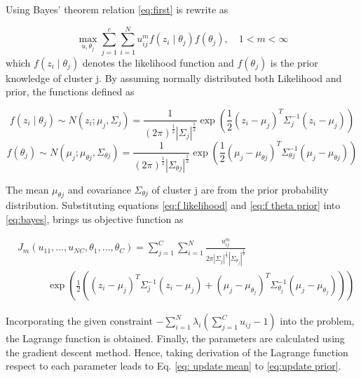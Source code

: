 \documentclass{article}
\begin{document}
Using Bayes' theorem relation \ref{eq:first} is rewrite as 

\begin{equation}\label{eq:bayes}
    \max_{u, \theta_j} \sum_{j=1}^{c} \sum_{i=1}^{N} u_{ij}^{m} f( z_i \mid \theta_j) f(\theta_j), \quad 1 < m < \infty
\end{equation}
which $f( z_i \mid \theta_j)$ denotes the likelihood function and $f(\theta_j)$ is the prior knowledge of cluster j.
By assuming normally distributed both Likelihood and prior, the functions defined as

\begin{equation} \label{eq:f likelihood}
    f(z_i \mid \theta_j) \sim N(z_i; \mu_j, \Sigma_j) = \frac{1}{(2\pi)^{\frac{1}{2}}|\Sigma_j|^{\frac{1}{2}}} \exp \left(\frac{1}{2} (z_i - \mu_j)^T \Sigma_j^{-1} (z_i - \mu_j) \right)
\end{equation}
\begin{equation} \label{eq:f theta prior}
    f(\theta_j) \sim N(\mu_j; \mu_{\theta j}, \Sigma_{\theta j}) = \frac{1}{(2\pi)^{\frac{1}{2}}|\Sigma_{\theta j}|^{\frac{1}{2}}} \exp \left(\frac{1}{2} (\mu_j - \mu_{\theta j})^T \Sigma_{\theta j}^{-1} (\mu_j - \mu_{\theta j}) \right)
\end{equation}

The mean $\mu_{\theta j}$ and covariance $\Sigma_{\theta j}$ of cluster j are from the prior probability distribution. Substituting equations \ref{eq:f likelihood} and \ref{eq:f theta prior} into \ref{eq:bayes}, brings us objective function as  

\begin{equation}\label{eq:obj function}
\begin{split}
        & J_m(u_{11}, \ldots, u_{NC}, \theta_1, \ldots, \theta_C)  = \sum_{j=1}^{C}  \sum_{i=1}^{N} \frac{u_{ij}^m}{2\pi \left| \Sigma_j \right|^{\frac{1}{2}} \left| \Sigma_{\theta_j} \right|^{\frac{1}{2}}} \\
         & \quad \quad \quad \exp \left( \frac{1}{2} \left( (z_i - \mu_j)^T \Sigma_j^{-1} (z_i - \mu_j) + (\mu_j - \mu_{\theta_j})^T \Sigma_{\theta_j}^{-1} (\mu_j - \mu_{\theta_j}) \right) \right)
\end{split}
\end{equation}

Incorporating the given constraint $
- \sum_{i=1}^{N} \lambda_i \left( \sum_{j=1}^{C} u_{ij} - 1 \right)$ into the problem, the Lagrange function is obtained. Finally, the parameters are calculated using the gradient descent method. Hence, taking derivation of the Lagrange function respect to each parameter leads to Eq. \ref{eq: update mean} to \ref{eq:update prior}.
\end{document}
